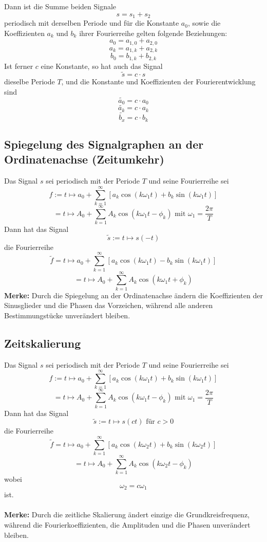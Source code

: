 \documentclass[10pt,a4paper]{scrartcl}
\begin{document}
Dann ist die Summe beiden Signale
$$s = s_1 + s_2$$
periodisch mit derselben Periode und für die Konstante $a_0$, sowie die
Koeffizienten $a_k$ und $b_k$ ihrer Fourierreihe gelten folgende Beziehungen:
$$a_0 = a_{1,0} + a_{2,0}$$
$$a_k = a_{1,k} + a_{2,k}$$
$$b_0 = b_{1,k} + b_{2,k}$$
Ist ferner $c$ eine Konstante, so hat auch das Signal
$$\tilde{s} = c \cdot s$$
dieselbe Periode $T$, und die Konstante und Koeffizienten der
Fourierentwicklung sind
$$\tilde{a_0} = c \cdot a_0$$
$$\tilde{a_k} = c \cdot a_k$$
$$\tilde{b_x} = c \cdot b_k$$


\subsection{Spiegelung des Signalgraphen an der Ordinatenachse (Zeitumkehr)}

Das Signal $s$ sei periodisch mit der Periode $T$ und seine Fourierreihe sei
$$f:= t \mapsto a_0 + \sum_{k=1}^{\infty} \left[a_k\cos(k\omega_1t) + b_k\sin(k\omega_1t)\right]$$
$$= t \mapsto A_0 + \sum_{k=1}^{\infty} A_k \cos(k\omega_1t - \phi_k) \textrm{ mit } \omega_1 = \frac{2\pi}{T}$$
Dann hat das Signal
$$\tilde{s} := t \mapsto s(-t)$$
die Fourierreihe
$$\tilde{f} = t \mapsto a_0 + \sum_{k=1}^{\infty} \left[a_k \cos(k\omega_1t) - b_k\sin(k\omega_1t)\right]$$
$$= t \mapsto A_0 + \sum_{k=1}^{\infty} A_k\cos(k\omega_1t + \phi_k)$$
\textbf{Merke:} Durch die Spiegelung an der Ordinatenachse ändern die Koeffizienten der Sinusglieder
und die Phasen das Vorzeichen, während alle anderen Bestimmungstücke unverändert bleiben.


\subsection{Zeitskalierung}

Das Signal $s$ sei periodisch mit der Periode $T$ und seine Fourierreihe sei
$$f:= t \mapsto a_0 + \sum_{k=1}^{\infty} \left[a_k\cos(k\omega_1t) + b_k\sin(k\omega_1t)\right]$$
$$= t \mapsto A_0 + \sum_{k=1}^{\infty} A_k \cos(k\omega_1t - \phi_k) \textrm{ mit } \omega_1 = \frac{2\pi}{T}$$
Dann hat das Signal
$$\tilde{s} := t \mapsto s(ct) \textrm{ für } c > 0$$
die Fourierreihe
$$\tilde{f} = t \mapsto a_0 + \sum_{k=1}^{\infty} \left[a_k \cos(k\omega_2t) + b_k\sin(k\omega_2t)\right]$$
$$= t \mapsto A_0 + \sum_{k=1}^{\infty} A_k\cos(k\omega_2t - \phi_k)$$
wobei
$$\omega_2 = c\omega_1$$
ist.\\\\
\textbf{Merke:} Durch die zeitliche Skalierung ändert einzige die Grundkreisfrequenz,
während die Fourierkoeffizienten, die Amplituden und die Phasen unverändert bleiben.
\end{document}

